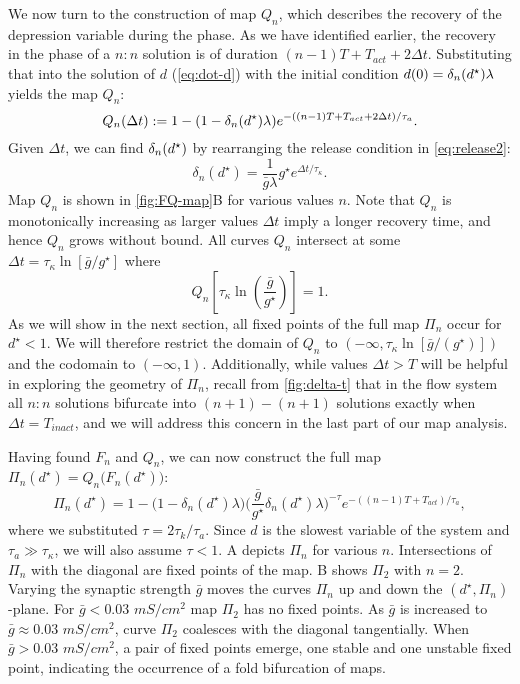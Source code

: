 We now turn to the construction of map $Q_n$, which describes the recovery of the depression variable during the \suppressed{} phase.
As we have identified earlier, the recovery in the \suppressed{} phase of a $n:n$ solution is of duration $(n-1)T + T_{act} + 2\Delta t$.
Substituting that into the solution of $d$ (\cref{eq:dot-d}) with the initial condition $d(0)=\delta_n(d^\star) \lambda$ yields the map $Q_{n}$:
\begin{equation}
	\label{eq:Qn-map}
	Q_n(\Delta t) := 1- (1- \delta_n(d^\star) \lambda)e^{-((n-1)T + T_{act} + 2\Delta t)/\tau_a}.
\end{equation}
Given $\Delta t$, we can find $\delta_n(d^\star)$ by rearranging the release condition in \cref{eq:release2}:
\begin{equation}
	\label{eq:dn}
	\delta_n(d^\star) = \frac{1}{\bar g \lambda} g^\star e^{\Delta t/\tau_\kappa}.
\end{equation}
Map $Q_n$ is shown in \cref{fig:FQ-map}B for various values $n$.
Note that $Q_n$ is monotonically increasing as larger values $\Delta t$ imply a longer recovery time, and hence $Q_{n}$ grows without bound.
All curves $Q_{n}$ intersect at some $\Delta t = \tau_\kappa\ln{\left[\bar g/g^\star\right]}$ where
\begin{equation}
	\label{eq:Qn-intersect}
	Q_n\left[\tau_\kappa\ln{\left(\frac{\bar g}{g^\star}\right)}\right]=1.
\end{equation}
As we will show in the next section, all fixed points of the full map $\Pi_n$ occur for $d^\star<1$.
We will therefore restrict the domain of $Q_n$ to $(-\infty, \tau_\kappa\ln{\left[\bar g/(g^\star)\right]})$ and the codomain to $(-\infty, 1)$.
Additionally, while values $\Delta t>T$ will be helpful in exploring the geometry of $\Pi_{n}$, recall from \cref{fig:delta-t} that in the flow system all $n:n$ solutions bifurcate into $(n+1)-(n+1)$ solutions exactly when $\Delta t = T_{inact}$, and we will address this concern in the last part of our map analysis.

Having found $F_n$ and $Q_n$, we can now construct the full map $\Pi_n(d^\star)=Q_n\big(F_n(d^\star)\big)$:
\begin{equation}
	\label{eq:Pn-map}
	\Pi_n(d^\star) = 1 - \Big(1 - \delta_n(d^\star) \lambda \Big)
	\Big(\frac{\bar g}{g^\star}\delta_n(d^\star) \lambda \Big)^{-\tau}
	e^{-((n-1)T + T_{act})/\tau_a},
\end{equation}
where we substituted $\tau = 2\tau_{k}/\tau_{a}$.
Since $d$ is the slowest variable of the system and $\tau_a \gg \tau_\kappa$, we will also assume $\tau<1$.
A depicts $\Pi_n$ for various $n$.
Intersections of $\Pi_{n}$ with the diagonal are fixed points of the map.
B shows $\Pi_{2}$ with $n=2$.
Varying the synaptic strength $\bar g$ moves the curves $\Pi_{n}$ up and down the $(d^{\star}, \Pi_{n})$-plane.
For $\bar g < 0.03$ $\si{mS/cm^{2}}$ map $\Pi_{2}$ has no fixed points.
As $\bar g$ is increased to $\bar g \approx 0.03$ $\si{mS/cm^{2}}$, curve $\Pi_{2}$ coalesces with the diagonal tangentially.
When $\bar g > 0.03$ $\si{mS/cm^{2}}$, a pair of fixed points emerge, one stable and one unstable fixed point, indicating the occurrence of a fold bifurcation of maps.


